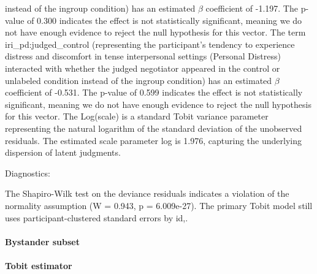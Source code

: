 \documentclass[11pt]{article}
\begin{document}
instead of the ingroup condition) has an estimated $\beta$ coefficient of -1.197. The p-value of 0.300 indicates the effect is not statistically significant, meaning we do not have enough evidence to reject the null hypothesis for this vector. The term iri\_pd:judged\_control (representing the participant's tendency to experience distress and discomfort in tense interpersonal settings (Personal Distress) interacted with whether the judged negotiator appeared in the control or unlabeled condition instead of the ingroup condition) has an estimated $\beta$ coefficient of -0.531. The p-value of 0.599 indicates the effect is not statistically significant, meaning we do not have enough evidence to reject the null hypothesis for this vector. The Log(scale) is a standard Tobit variance parameter representing the natural logarithm of the standard deviation of the unobserved residuals. The estimated scale parameter log is 1.976, capturing the underlying dispersion of latent judgments.

Diagnostics:

The Shapiro-Wilk test on the deviance residuals indicates a violation of the normality assumption (W = 0.943, p = 6.009e-27). The primary Tobit model still uses participant-clustered standard errors by id,.


\paragraph{Bystander subset}

\paragraph{Tobit estimator}
\end{document}
